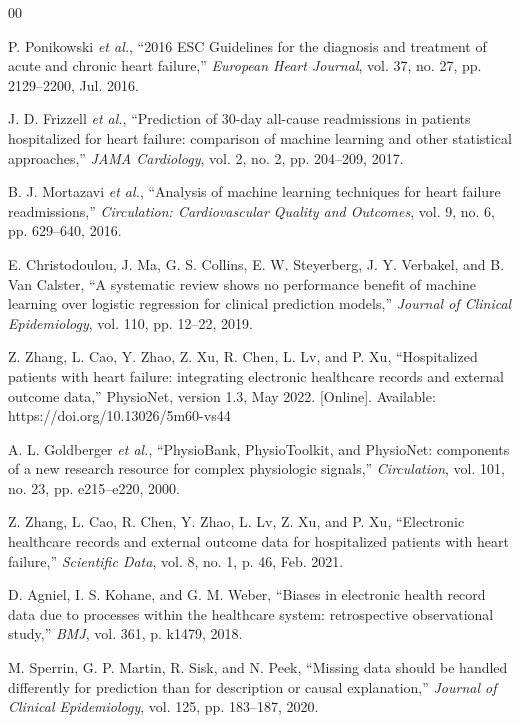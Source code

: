 \documentclass[conference]{IEEEtran}
\begin{document}
\begin{thebibliography}{00}

 P. Ponikowski \textit{et al.}, ``2016 ESC Guidelines for the diagnosis and treatment of acute and chronic heart failure,'' \textit{European Heart Journal}, vol. 37, no. 27, pp. 2129--2200, Jul. 2016.

 J. D. Frizzell \textit{et al.}, ``Prediction of 30-day all-cause readmissions in patients hospitalized for heart failure: comparison of machine learning and other statistical approaches,'' \textit{JAMA Cardiology}, vol. 2, no. 2, pp. 204--209, 2017.

 B. J. Mortazavi \textit{et al.}, ``Analysis of machine learning techniques for heart failure readmissions,'' \textit{Circulation: Cardiovascular Quality and Outcomes}, vol. 9, no. 6, pp. 629--640, 2016.

 E. Christodoulou, J. Ma, G. S. Collins, E. W. Steyerberg, J. Y. Verbakel, and B. Van Calster, ``A systematic review shows no performance benefit of machine learning over logistic regression for clinical prediction models,'' \textit{Journal of Clinical Epidemiology}, vol. 110, pp. 12--22, 2019.

 Z. Zhang, L. Cao, Y. Zhao, Z. Xu, R. Chen, L. Lv, and P. Xu, ``Hospitalized patients with heart failure: integrating electronic healthcare records and external outcome data,'' PhysioNet, version 1.3, May 2022. [Online]. Available: https://doi.org/10.13026/5m60-vs44

 A. L. Goldberger \textit{et al.}, ``PhysioBank, PhysioToolkit, and PhysioNet: components of a new research resource for complex physiologic signals,'' \textit{Circulation}, vol. 101, no. 23, pp. e215--e220, 2000.

 Z. Zhang, L. Cao, R. Chen, Y. Zhao, L. Lv, Z. Xu, and P. Xu, ``Electronic healthcare records and external outcome data for hospitalized patients with heart failure,'' \textit{Scientific Data}, vol. 8, no. 1, p. 46, Feb. 2021.

 D. Agniel, I. S. Kohane, and G. M. Weber, ``Biases in electronic health record data due to processes within the healthcare system: retrospective observational study,'' \textit{BMJ}, vol. 361, p. k1479, 2018.

 M. Sperrin, G. P. Martin, R. Sisk, and N. Peek, ``Missing data should be handled differently for prediction than for description or causal explanation,'' \textit{Journal of Clinical Epidemiology}, vol. 125, pp. 183--187, 2020.


\end{thebibliography}
\end{document}
